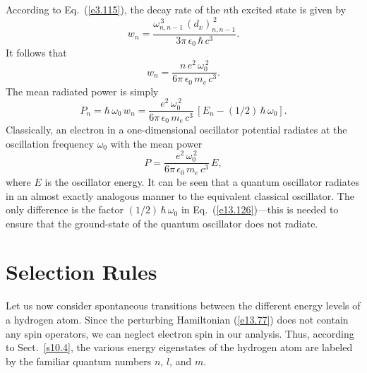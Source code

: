  According to Eq.~(\ref{e3.115}), the decay rate of the $n$th excited
 state is given by
 \begin{equation}
 w_n = \frac{\omega_{n,n-1}^{\,3}\,(d_x)_{n,n-1}^{\,2}}{3\pi\,\epsilon_0\,\hbar\,c^3}.
 \end{equation}
 It follows that
 \begin{equation}
 w_n = \frac{n\,e^2\,\omega_0^{\,2}}{6\pi\,\epsilon_0\,m_e\,c^3}.
 \end{equation}
 The mean radiated power is simply
 \begin{equation}\label{e13.126}
 P_n = \hbar\,\omega_0\,w_n = \frac{e^2\,\omega_0^{\,2}}{6\pi\,\epsilon_0\,m_e\,c^3}\,[E_n -(1/2)\,\hbar\,\omega_0].
 \end{equation}
 Classically, an electron in a one-dimensional oscillator potential
 radiates at the oscillation frequency $\omega_0$ with  the mean power
 \begin{equation}
 P= \frac{e^2\,\omega_0^{\,2}}{6\pi\,\epsilon_0\,m_e\,c^3}\,E,
 \end{equation}
 where $E$ is the oscillator energy. It can be seen that a quantum
 oscillator radiates in an almost exactly analogous manner to
the equivalent classical oscillator. The only difference is the
 factor $(1/2)\,\hbar\,\omega_0$ in Eq.~(\ref{e13.126})---this is
 needed to ensure that the ground-state of the quantum oscillator does not radiate.
 
 \section{Selection Rules}
 Let us now consider spontaneous transitions between the different energy levels
 of a hydrogen atom. Since the perturbing Hamiltonian (\ref{e13.77}) does
 not contain any spin operators, we can neglect electron spin in our analysis.
 Thus, according to Sect.~\ref{s10.4}, the various energy eigenstates of the
 hydrogen atom are labeled by the familiar  quantum numbers $n$, $l$, and
 $m$.
 
